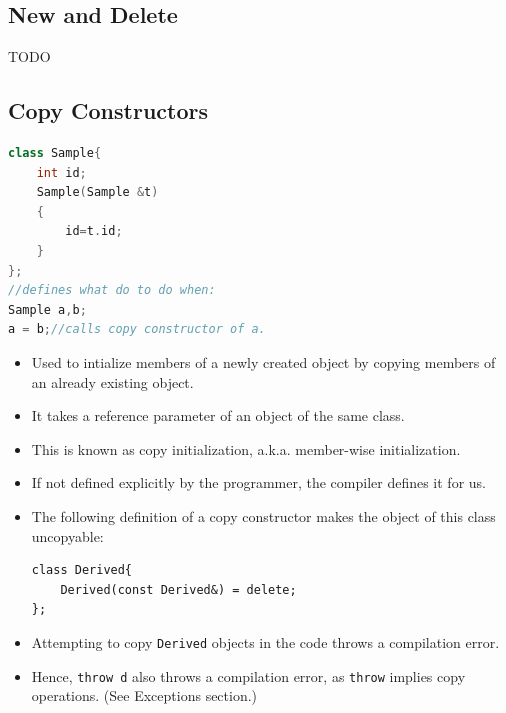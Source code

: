 \documentclass{report}
\begin{document}
\subsection{New and Delete}
TODO
\subsection{Copy Constructors}
\begin{lstlisting}[language=C++]
class Sample{
    int id;
    Sample(Sample &t)
    {
        id=t.id;
    }
};
//defines what do to do when:
Sample a,b;
a = b;//calls copy constructor of a.
\end{lstlisting}
\begin{itemize}
\item Used to intialize members of a newly created object by copying members of an already existing object.
\item It takes a reference parameter of an object of the same class.
\item This is known as copy initialization, a.k.a. member-wise initialization.
\item If not defined explicitly by the programmer, the compiler 
defines it for us.
\item The following definition of a copy constructor makes the object of this class uncopyable:
\begin{lstlisting}
class Derived{
    Derived(const Derived&) = delete;
};
\end{lstlisting}
\item Attempting to copy \texttt{Derived} objects in the code throws a compilation error.
\item Hence, \texttt{throw d} also throws a compilation error, as \texttt{throw} implies copy operations. (See Exceptions section.)
\end{itemize}
\end{document}
